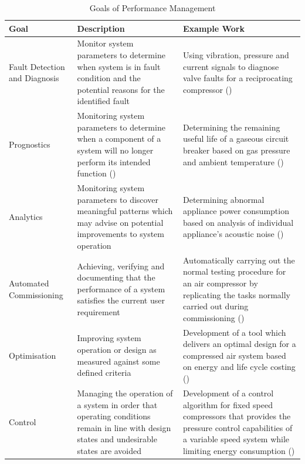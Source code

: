 \begin{table}
  \centering
  \caption{Goals of Performance Management}
    \begin{tabular}{p{.3\linewidth}p{.3\linewidth}p{.3\linewidth}}
    \toprule
    Goal  & Description & Example Work \\
    \midrule
    Fault Detection and Diagnosis & Monitor system parameters to determine when system is in fault condition and the potential reasons for the identified fault & Using vibration, pressure and current signals to diagnose valve faults for a reciprocating compressor (\cite{Tran2014}) \\
    \midrule
    Prognostics & Monitoring system parameters to determine when a component of a system will no longer perform its intended function (\cite{Vachtsevanos2006}) & Determining the remaining useful life of a gaseous circuit breaker  based on gas pressure and ambient temperature (\cite{Catterson2013}) \\
    \midrule
    Analytics & Monitoring system parameters to discover meaningful patterns which may advise on potential improvements to system operation & Determining abnormal appliance power consumption based on analysis of individual appliance’s acoustic noise (\cite{Pathak2015}) \\
    \midrule
    Automated Commissioning & Achieving, verifying and documenting that the performance of a system satisfies the current user requirement & Automatically carrying out the normal testing procedure for an air compressor by replicating the tasks normally carried out during commissioning (\cite{Mazid2008}) \\
    \midrule
    Optimisation & Improving system operation or design as measured against some defined criteria & Development of a tool which delivers an optimal design for a compressed air system based on energy and life cycle costing (\cite{Friden2012}) \\
    \midrule
    Control & Managing the operation of a system in order that operating conditions remain in line with design states and undesirable states are avoided & Development of a control algorithm for fixed speed compressors that provides the pressure control capabilities of a variable speed system while limiting energy consumption (\cite{Facchinetti}) \\
    \bottomrule
    \end{tabular}%
  \label{tab:goalsmgmt}%
\end{table}%

